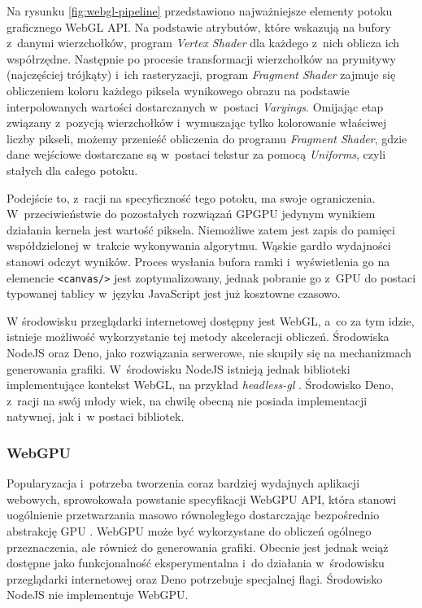 Na rysunku \ref{fig:webgl-pipeline} przedstawiono najważniejsze elementy potoku graficznego WebGL API. Na podstawie atrybutów, które wskazują na bufory z~danymi wierzchołków, program \textit{Vertex Shader} dla każdego z~nich oblicza ich współrzędne. Następnie po procesie transformacji wierzchołków na prymitywy (najczęściej trójkąty) i~ich rasteryzacji, program \textit{Fragment Shader} zajmuje się obliczeniem koloru każdego piksela wynikowego obrazu na podstawie interpolowanych wartości dostarczanych w~postaci \textit{Varyings}. Omijając etap związany z~pozycją wierzchołków i~wymuszając tylko kolorowanie właściwej liczby pikseli, możemy przenieść obliczenia do programu \textit{Fragment Shader}, gdzie dane wejściowe dostarczane są w~postaci tekstur za pomocą \textit{Uniforms}, czyli stałych dla całego potoku.

Podejście to, z~racji na specyficzność tego potoku, ma swoje ograniczenia. W~przeciwieństwie do pozostałych rozwiązań GPGPU jedynym wynikiem działania kernela jest wartość piksela. Niemożliwe zatem jest zapis do pamięci współdzielonej w~trakcie wykonywania algorytmu. Wąskie gardło wydajności stanowi odczyt wyników. Proces wysłania bufora ramki i~wyświetlenia go na elemencie \lstinline{<canvas/>} jest zoptymalizowany, jednak pobranie go z~GPU do postaci typowanej tablicy w~języku JavaScript jest już kosztowne czasowo.

W środowisku przeglądarki internetowej dostępny jest WebGL, a~co za tym idzie, istnieje możliwość wykorzystanie tej metody akceleracji obliczeń. Środowiska NodeJS oraz Deno, jako rozwiązania serwerowe, nie skupiły się na mechanizmach generowania grafiki. W~środowisku NodeJS istnieją jednak biblioteki implementujące kontekst WebGL, na przykład \textit{headless-gl} \cite{headless-gl}. Środowisko Deno, z~racji na swój młody wiek, na chwilę obecną nie posiada implementacji natywnej, jak i~w postaci bibliotek. 

\subsubsection{WebGPU}

Popularyzacja i~potrzeba tworzenia coraz bardziej wydajnych aplikacji webowych, sprowokowała powstanie specyfikacji WebGPU API, która stanowi uogólnienie przetwarzania masowo równoległego dostarczając bezpośrednio abstrakcję GPU \cite{webgpu_2022}. WebGPU może być wykorzystane do obliczeń ogólnego przeznaczenia, ale również do generowania grafiki. Obecnie jest jednak wciąż dostępne jako funkcjonalność eksperymentalna i~do działania w~środowisku przeglądarki internetowej oraz Deno potrzebuje specjalnej flagi. Środowisko NodeJS nie implementuje \mbox{WebGPU}.
